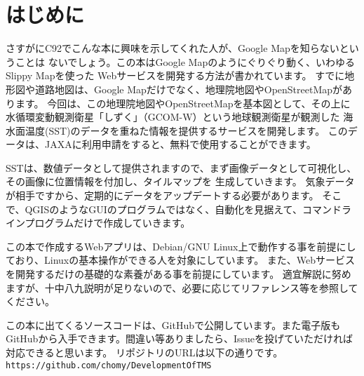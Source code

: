 \chapter*{はじめに}

さすがにC92でこんな本に興味を示してくれた人が、Google Mapを知らないということは
ないでしょう。この本はGoogle Mapのようにぐりぐり動く、いわゆるSlippy Mapを使った
Webサービスを開発する方法が書かれています。
すでに地形図や道路地図は、Google Mapだけでなく、地理院地図やOpenStreetMapがあります。
今回は、この地理院地図やOpenStreetMapを基本図として、その上に
水循環変動観測衛星「しずく」（GCOM-W）という地球観測衛星が観測した
海水面温度(SST)のデータを重ねた情報を提供するサービスを開発します。
このデータは、JAXAに利用申請をすると、無料で使用することができます。

SSTは、数値データとして提供されますので、まず画像データとして可視化し、その画像に位置情報を付加し、タイルマップを
生成していきます。
気象データが相手ですから、定期的にデータをアップデートする必要があります。
そこで、QGISのようなGUIのプログラムではなく、自動化を見据えて、コマンドラインプログラムだけで作成していきます。

この本で作成するWebアプリは、Debian/GNU Linux上で動作する事を前提にしており、Linuxの基本操作ができる人を対象にしています。
また、Webサービスを開発するだけの基礎的な素養がある事を前提にしています。
適宜解説に努めますが、十中八九説明が足りないので、必要に応じてリファレンス等を参照してください。

この本に出てくるソースコードは、GitHubで公開しています。また電子版もGitHubから入手できます。間違い等ありましたら、Issueを投げていただければ対応できると思います。
リポジトリのURLは以下の通りです。\\
\texttt{https://github.com/chomy/DevelopmentOfTMS}


